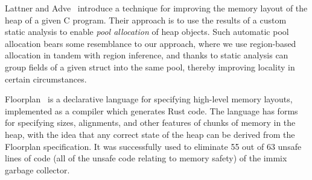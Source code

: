 Lattner and Adve~\cite{poolallocation} introduce a technique for improving the memory layout of the heap of a given C program.
%
Their approach is to use the results of a custom static analysis to enable \emph{pool allocation} of heap objects.
%
Such automatic pool allocation bears some resemblance to our approach, where we use region-based allocation in tandem with region inference, and thanks to static analysis can group fields of a given struct into the same pool, thereby
improving locality in certain circumstances.
%

Floorplan~\cite{Floorplan} is a declarative language for specifying high-level memory layouts, implemented as a compiler which generates Rust code. The language has forms for specifying sizes, alignments, and other features of chunks of memory in the heap, with the idea that any correct state of the heap can be derived from the Floorplan specification. It was successfully used to eliminate 55 out of 63 unsafe lines of code (all of the unsafe code relating to memory safety) of the immix garbage collector.







